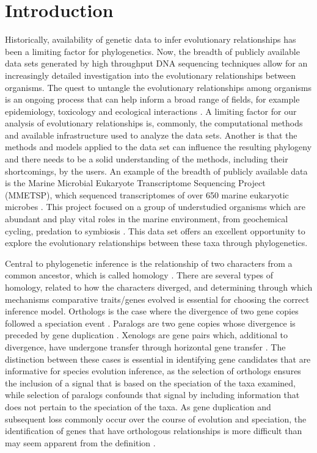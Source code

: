 \documentclass[12pt]{article}
\begin{document}
\section{Introduction}
Historically, availability of genetic data to infer evolutionary relationships has been a limiting factor for phylogenetics.
Now, the breadth of publicly available data sets generated by high throughput DNA sequencing techniques allow for an increasingly detailed investigation into the evolutionary relationships between organisms.
The quest to untangle the evolutionary relationships among organisms is an ongoing process that can help inform a broad range of fields, for example epidemiology, toxicology and ecological interactions \cite{mctavish2017and}.
A limiting factor for our analysis of evolutionary relationships is, commonly, the computational methods and available infrastructure used to analyze the data sets. 
Another is that the methods and models applied to the data set can influence the resulting phylogeny and there needs to be a solid understanding of the methods, including their shortcomings, by the users.
An example of the breadth of publicly available data is the Marine Microbial Eukaryote Transcriptome Sequencing Project (MMETSP), which sequenced transcriptomes of over 650 marine eukaryotic microbes \cite{keeling2014marine}. 
This project focused on a group of understudied organisms which are abundant and play vital roles in the marine environment, from geochemical cycling, predation to symbiosis \cite{gomez2005list,gomez2012quantitative}. 
This data set offers an excellent opportunity to explore the evolutionary relationships between these taxa through phylogenetics. 

Central to phylogenetic inference is the relationship of two characters from a common ancestor, which is called homology \cite{fitch2000homology}. 
There are several types of homology, related to how the characters diverged, and determining through which mechanisms comparative traits/genes evolved is essential for choosing the correct inference model. 
Orthologs is the case where the divergence of two gene copies followed a speciation event \cite{fitch1970distinguishing}. 
Paralogs are two gene copies whose divergence is preceded by gene duplication \cite{fitch1970distinguishing}.
Xenologs are gene pairs which, additional to divergence, have undergone transfer through horizontal gene transfer \cite{darby2016xenolog}.
The distinction between these cases is essential in identifying gene candidates that are informative for species evolution inference, as the selection of orthologs ensures the inclusion of a signal that is based on the speciation of the taxa examined, while selection of paralogs confounds that signal by including information that does not pertain to the speciation of the taxa. 
As gene duplication and subsequent loss commonly occur over the course of evolution and speciation, the identification of genes that have orthologous relationships is more difficult than may seem apparent from the definition \cite{gabaldon2008large}. 
\end{document}

